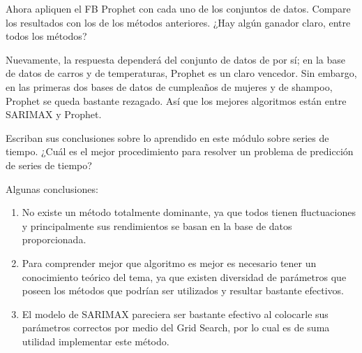 \begin{problema}
	Ahora apliquen el FB Prophet con cada uno de los conjuntos de datos. Compare los resultados con los de los métodos anteriores.  ¿Hay algún ganador claro, entre todos los métodos?
	\begin{sol}
		Nuevamente, la respuesta dependerá del conjunto de datos de por sí; en la base de datos de carros y de temperaturas, Prophet es un claro vencedor. Sin embargo, en las primeras dos bases de datos de cumpleaños de mujeres y de shampoo, Prophet se queda bastante rezagado. Así que los mejores algoritmos están entre SARIMAX y Prophet. 
	\end{sol}
\end{problema}


\begin{problema}
	 Escriban sus conclusiones sobre lo aprendido en este módulo sobre series de tiempo.  ¿Cuál es el mejor procedimiento para resolver un problema de predicción de series de tiempo?  
	 \begin{sol}
	 	Algunas conclusiones:
	 	\begin{enumerate}
	 		\item No existe un método totalmente dominante, ya que todos tienen fluctuaciones y principalmente sus rendimientos se basan en la base de datos proporcionada. 
	 		\item Para comprender mejor que algoritmo es mejor es necesario tener un conocimiento teórico del tema, ya que existen diversidad de parámetros que poseen los métodos que podrían ser utilizados y resultar bastante efectivos.
	 		\item El modelo de SARIMAX pareciera ser bastante efectivo al colocarle sus parámetros correctos por medio del Grid Search, por lo cual es de suma utilidad implementar este método.
	 	\end{enumerate}
	 \end{sol}
\end{problema}






